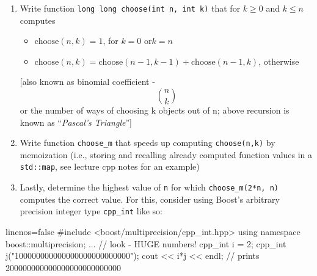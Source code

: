 \documentclass[a4paper,11pt]{article}
\begin{document}
\begin{enumerate}[label=\alph*)]
    \item Write function \texttt{long long choose(int n, int k)} that for $k \ge 0$ and $k \le n$ computes
        \begin{itemize}
            \item $\text{choose}(n, k) = 1$, for $k=0$ or$ k=n$
            \item $\text{choose}(n, k) = \text{choose}(n-1,k-1) + \text{choose}(n-1, k)$, otherwise
        \end{itemize}
        
        [also known as binomial coefficient -
        \[ \binom{n}{k} \]
        or the number of ways of choosing k objects out of n; above recursion is known
        as ``\textit{Pascal's Triangle}'']

    \item Write function \texttt{choose\_m} that speeds up computing \texttt{choose(n,k)} by memoization
        (i.e., storing and recalling already computed function values in a \texttt{std::map},
        see lecture cpp notes for an example)

    \item Lastly, determine the highest value of \texttt{n} for which \texttt{choose\_m(2*n, n)} computes
    the correct value. For this, consider using Boost's arbitrary precision
    integer type \texttt{cpp\_int} like so:
    \end{enumerate}
\begin{cppcode*}{linenos=false}
#include <boost/multiprecision/cpp_int.hpp>
using namespace boost::multiprecision;
...
// look - HUGE numbers!
cpp_int i = 2;
cpp_int j("100000000000000000000000000");
cout << i*j << endl;   // prints 200000000000000000000000000     
\end{cppcode*}
\end{document}
